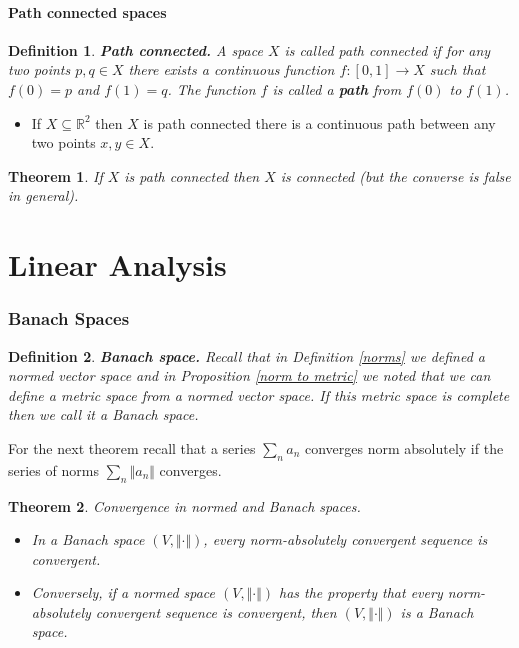 \documentclass[two column]{article}
\newtheorem{theorem}{Theorem}[subsection]
\newtheorem{definition}{Definition}[subsection]
\begin{document}
\subsection{Path connected spaces}

\begin{definition}
{\bf Path connected.} A space $X$ is called path connected if for any two points $p,q \in X$ there exists a continuous function $f: [0,1] \rightarrow X$ such that $f(0) = p$ and $f(1) = q$. The function $f$ is called a {\bf path} from $f(0)$ to $f(1)$.
\end{definition}
\begin{itemize}
\item If $X \subseteq \mathbb{R}^{2}$ then $X$ is path connected there is a continuous path between any two points $x,y \in X$.  \\
\end{itemize}

\begin{theorem}
If $X$ is path connected then $X$ is connected (but the converse is false in general).
\end{theorem}

\newpage

\part{Linear Analysis}

\section{Banach Spaces}

\begin{definition}
{\bf Banach space.} Recall that in Definition \ref{norms} we defined a normed vector space and in Proposition \ref{norm to metric} we noted that we can define a metric space from a normed vector space. If this metric space is complete then we call it a Banach space.  
\end{definition}

For the next theorem recall that a series $\sum_{n} a_{n}$ converges norm absolutely if the series of norms $\sum_{n} \Vert a_{n} \Vert$ converges. \\

\begin{theorem}
Convergence in normed and Banach spaces. 
\begin{itemize} 
\item In a Banach space $(V, \Vert \cdot \Vert)$, every norm-absolutely convergent sequence is convergent. 
\item Conversely, if a normed space $(V, \Vert \cdot \Vert)$ has the property that every norm-absolutely convergent sequence is convergent, then $(V, \Vert \cdot \Vert)$ is a Banach space.   \\
\end{itemize}
\end{theorem}
\end{document}
